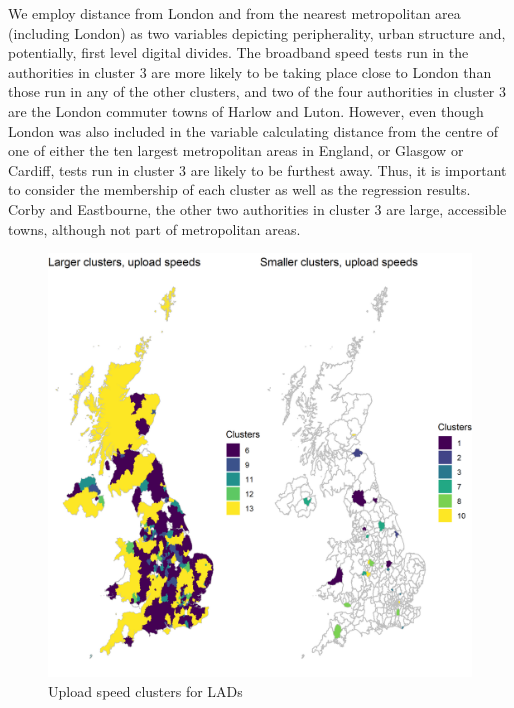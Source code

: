 \documentclass[]{interact}
\theoremstyle{plain}%
\theoremstyle{definition}
\theoremstyle{remark}
\begin{document}
We employ distance from London and from the nearest metropolitan area
(including London) as two variables depicting peripherality, urban
structure and, potentially, first level digital divides. The broadband
speed tests run in the authorities in cluster \(3\) are more likely to
be taking place close to London than those run in any of the other
clusters, and two of the four authorities in cluster \(3\) are the
London commuter towns of Harlow and Luton. However, even though London
was also included in the variable calculating distance from the centre
of one of either the ten largest metropolitan areas in England, or
Glasgow or Cardiff, tests run in cluster \(3\) are likely to be furthest
away. Thus, it is important to consider the membership of each cluster
as well as the regression results. Corby and Eastbourne, the other two
authorities in cluster \(3\) are large, accessible towns, although not
part of metropolitan areas.

\begin{figure}
\includegraphics[width=0.95\linewidth]{figures/map.up.clusters} \caption{\label{map.up.clusters}Upload speed clusters for LADs}\label{fig:unnamed-chunk-6}
\end{figure}
\end{document}
